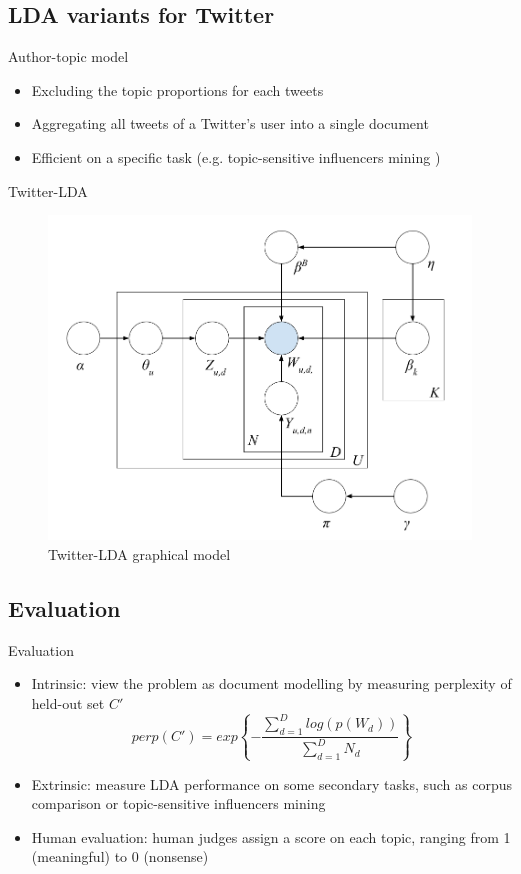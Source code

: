 \documentclass{beamer}
\begin{document}
\subsection{LDA variants for Twitter}
\begin{frame}{Author-topic model}
	\begin{itemize}
		\item Excluding the topic proportions for each tweets
		\item Aggregating all tweets of a Twitter's user into a single document \parencite{Weng2010,hong2010empirical}
		\item Efficient on a specific task (e.g. topic-sensitive influencers mining \parencite{Weng2010})
	\end{itemize}
\end{frame}
\begin{frame}{Twitter-LDA}
	\begin{figure}[h]
		\centering
		\includegraphics[scale=0.2]{twitter_lda_model}
		\caption{Twitter-LDA graphical model}
		\label{fig:twitter_lda_model}
	\end{figure}
\end{frame}

\subsection{Evaluation}
\begin{frame}{Evaluation}
	\begin{itemize}
		\item Intrinsic: view the problem as document modelling \parencite{Blei2003} by measuring perplexity of held-out set $C'$
		\[perp(C')=exp\left\{-\frac{\sum_{d=1}^{D}{log(p(W_d))}}{\sum_{d=1}^{D}N_d}\right\}\]
		\item Extrinsic: measure LDA performance on some secondary tasks, such as corpus comparison or topic-sensitive influencers mining \parencite{Weng2010}
		\item Human evaluation: human judges assign a score on each topic, ranging from 1 (meaningful) to 0 (nonsense)\parencite{zhao2011comparing}
	\end{itemize}
\end{frame}
\end{document}
